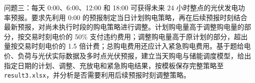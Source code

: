 问题三：每天 0:00、6:00、12:00 和 18:00 可获得未来 24 小时整点的光伏发电功率预报。要求先利用 0:00 的预报制定当日计划购电策略，再在后续预报时刻结合最新预报，对尚未执行时段的购电策略进行调整。计划购电量高于调整购电量的部分，按交易时刻电价的 50\% 支付违约费用；调整购电量高于原计划的部分，超出量按交易时刻电价的 1.5 倍计费；总购电费用还应计入紧急购电费用。基于题给电价、负荷与光伏实际数据及多时点光伏预报，建立当天购电与储能调度模型，给出指定日期的计划、调整、充放电和紧急购电结果，按模板保存完整策略至 \texttt{result3.xlsx}，并分析是否需要利用后续预报时刻调整策略。
